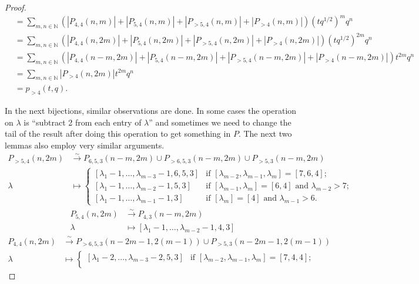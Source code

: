 \documentclass[a4paper, 12pt, reqno]{amsart}
\theoremstyle{remark}
\begin{document}
\begin{proof}
\begin{align*}
    &= \sum_{m, n \in \mathbb{N}}(|P_{4, 4}(n, m)| + |P_{5, 4}(n, m)| + |P_{>5, 4}(n, m)| + |P_{>4}(n, m)|)(tq^{1/2})^mq^n \\
    &= \sum_{m, n \in \mathbb{N}}(|P_{4, 4}(n, 2m)| + |P_{5, 4}(n, 2m)| + |P_{>5, 4}(n, 2m)| + |P_{>4}(n, 2m)|)(tq^{1/2})^{2m}q^n \\
    &= \sum_{m, n \in \mathbb{N}}(|P_{4, 4}(n - m, 2m)| + |P_{5, 4}(n - m, 2m)| + |P_{>5, 4}(n - m, 2m)| + |P_{>4}(n - m, 2m)|)t^{2m}q^n \\
    &= \sum_{m, n \in \mathbb{N}}|P_{>4}(n, 2m)|t^{2m}q^n \\
    &= p_{>4}(t, q).
  \end{align*}
  
  In the next bijections, similar observations are done.
  In some cases the operation on $\lambda$ is ``subtract 2 from each entry of $\lambda$'' and sometimes we need to change the tail of the result after doing this operation to get something in $P$.
  The next two lemmas also employ very similar arguments.
  \begin{align*}
    P_{>5, 4}(n, 2m) &\xrightarrow{\sim} P_{6, 5, 3}(n - m, 2m) \cup P_{>6, 5, 3}(n - m, 2m) \cup P_{>5, 3}(n - m, 2m) \\
    \lambda &\mapsto
              \begin{cases}
                [\lambda_1 - 1, \dots, \lambda_{m - 3} - 1, 6, 5, 3] &\text{if }[\lambda_{m - 2}, \lambda_{m - 1}, \lambda_m] = [7, 6, 4]; \\
                [\lambda_1 - 1, \dots, \lambda_{m - 2} - 1, 5, 3] &\text{if }[\lambda_{m - 1}, \lambda_m] = [6, 4]\text{ and }\lambda_{m - 2} > 7; \\
                [\lambda_1 - 1, \dots, \lambda_{m - 1} - 1, 3] &\text{if }[\lambda_m] = [4]\text{ and }\lambda_{m - 1} > 6.
              \end{cases}
  \end{align*}
  \begin{align*}
    P_{5, 4}(n, 2m) &\xrightarrow{\sim} P_{4, 3}(n - m, 2m) \\
    \lambda &\mapsto [\lambda_1 - 1, \dots, \lambda_{m - 2} - 1, 4, 3]
  \end{align*}
  \begin{align*}
    P_{4, 4}(n, 2m) &\xrightarrow{\sim} P_{>6, 5, 3}(n - 2m - 1, 2(m - 1)) \cup P_{>5, 3}(n - 2m - 1, 2(m - 1)) \\
    \lambda &\mapsto
              \begin{cases}
                [\lambda_1 - 2, \dots, \lambda_{m - 3} - 2, 5, 3] &\text{if }[\lambda_{m - 2}, \lambda_{m - 1}, \lambda_m] = [7, 4, 4]; \\

\end{cases}
\end{align*}
\end{proof}
\end{document}

